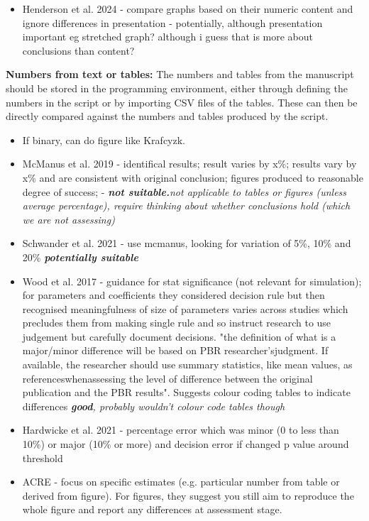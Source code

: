 \begin{itemize}
    \item Henderson et al. 2024 - compare graphs based on their numeric content and ignore differences in presentation\autocite{mcmanus_can_2019} - potentially, although presentation important eg stretched graph? although i guess that is more about conclusions than content?
\end{itemize}

\textbf{Numbers from text or tables:} The numbers and tables from the manuscript should be stored in the programming environment, either through defining the numbers in the script or by importing CSV files of the tables. These can then be directly compared against the numbers and tables produced by the script.

\begin{itemize}
    \item If binary, can do figure like Krafcyzk.
    \item McManus et al. 2019 - identifical results; result varies by x\%; results vary by x\% and are consistent with original conclusion; figures produced to reasonable degree of success;\autocite{mcmanus_can_2019} - \textit{\textbf{not suitable.}not applicable to tables or figures (unless average percentage), require thinking about whether conclusions hold (which we are not assessing)}
    \item Schwander et al. 2021 - use mcmanus, looking for variation of 5\%, 10\% and 20\%\autocite{schwander_replication_2021} \textit{\textbf{potentially suitable}}
    \item Wood et al. 2017 - guidance for stat significance (not relevant for simulation); for parameters and coefficients they considered decision rule but then recognised meaningfulness of size of parameters varies across studies which precludes them from making single rule and so instruct research to use judgement but carefully document decisions. "the definition of what is a major/minor difference will be based on PBR researcher’sjudgment. If available, the researcher should use summary statistics, like mean values, as referenceswhenassessing the level of difference between the original publication and the PBR results". Suggests colour coding tables to indicate differences\autocite{wood_push_2018, wood_replication_2018} \textit{\textbf{good}, probably wouldn't colour code tables though}
    \item Hardwicke et al. 2021 - percentage error which was minor (0 to less than 10\%) or major (10\% or more) and decision error if changed p value around threshold\autocite{hardwicke_analytic_2021, hardwicke_pre-registered_2017}
    \item ACRE - focus on specific estimates (e.g. particular number from table or derived from figure). For figures, they suggest you still aim to reproduce the whole figure and report any differences at assessment stage.\autocite{berkeley_initiative_for_transparency_in_the_social_sciences_guide_2022}
\end{itemize}

